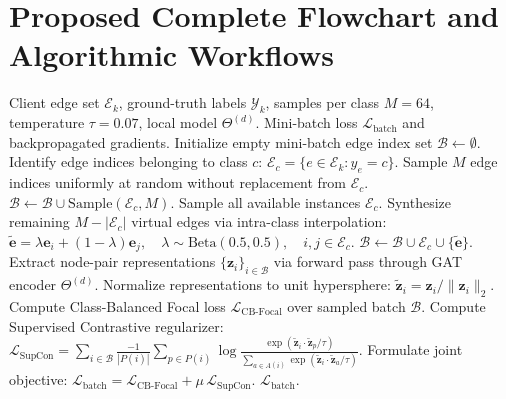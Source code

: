 \documentclass[12pt,a4paper]{report}
\begin{document}
\section{Proposed Complete Flowchart and Algorithmic Workflows}\label{sec:flowchart}
\begin{algorithm}[H]
\caption{Dynamic Class-Balanced Sampling and SupCon Loss Evaluation}\label{alg:dynamic_sampling}
\begin{algorithmic}[1]
\Require Client edge set $\mathcal{E}_k$, ground-truth labels $\mathcal{Y}_k$, samples per class $M=64$, temperature $\tau=0.07$, local model $\Theta^{(d)}$.
\Ensure Mini-batch loss $\mathcal{L}_{\text{batch}}$ and backpropagated gradients.
\State Initialize empty mini-batch edge index set $\mathcal{B} \gets \emptyset$.
    \State Identify edge indices belonging to class $c$: $\mathcal{E}_c = \{e \in \mathcal{E}_k : y_e = c\}$.
        \State Sample $M$ edge indices uniformly at random without replacement from $\mathcal{E}_c$.
        \State $\mathcal{B} \gets \mathcal{B} \cup \text{Sample}(\mathcal{E}_c, M)$.
        \State Sample all available instances $\mathcal{E}_c$.
        \State Synthesize remaining $M - |\mathcal{E}_c|$ virtual edges via intra-class interpolation:
        \State $\tilde{\mathbf{e}} = \lambda \mathbf{e}_i + (1 - \lambda) \mathbf{e}_j, \quad \lambda \sim \text{Beta}(0.5, 0.5), \quad i, j \in \mathcal{E}_c$.
        \State $\mathcal{B} \gets \mathcal{B} \cup \mathcal{E}_c \cup \{\tilde{\mathbf{e}}\}$.
    \EndIf
\EndFor
\State Extract node-pair representations $\{\mathbf{z}_i\}_{i \in \mathcal{B}}$ via forward pass through GAT encoder $\Theta^{(d)}$.
\State Normalize representations to unit hypersphere: $\tilde{\mathbf{z}}_i = \mathbf{z}_i / \|\mathbf{z}_i\|_2$.
\State Compute Class-Balanced Focal loss $\mathcal{L}_{\text{CB-Focal}}$ over sampled batch $\mathcal{B}$.
\State Compute Supervised Contrastive regularizer:
\State $\mathcal{L}_{\text{SupCon}} = \sum_{i \in \mathcal{B}} \frac{-1}{|P(i)|} \sum_{p \in P(i)} \log \frac{\exp(\tilde{\mathbf{z}}_i \cdot \tilde{\mathbf{z}}_p / \tau)}{\sum_{a \in A(i)} \exp(\tilde{\mathbf{z}}_i \cdot \tilde{\mathbf{z}}_a / \tau)}$.
\State Formulate joint objective: $\mathcal{L}_{\text{batch}} = \mathcal{L}_{\text{CB-Focal}} + \mu \, \mathcal{L}_{\text{SupCon}}$.
\State \Return $\mathcal{L}_{\text{batch}}$.
\end{algorithmic}
\end{algorithm}
\end{document}
